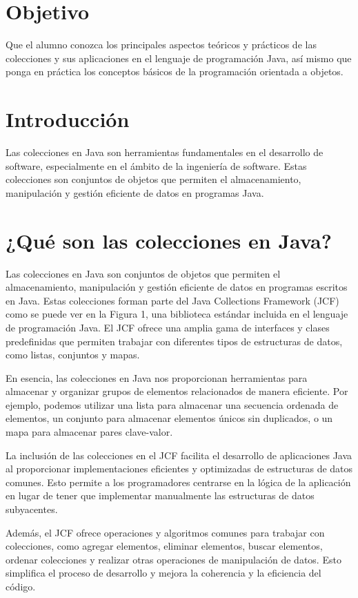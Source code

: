 \documentclass[a4paper,12pt]{article}
\begin{document}
\section{Objetivo}
Que el alumno conozca los principales aspectos teóricos y prácticos de las colecciones y sus aplicaciones en el lenguaje de programación Java, así mismo que ponga en práctica los conceptos básicos de la programación orientada a objetos.

\section{Introducción}

Las colecciones en Java son herramientas fundamentales en el desarrollo de software, especialmente en el ámbito de la ingeniería de software. Estas colecciones son conjuntos de objetos que permiten el almacenamiento, manipulación y gestión eficiente de datos en programas Java.

\section{¿Qué son las colecciones en Java?}

Las colecciones en Java son conjuntos de objetos que permiten el almacenamiento, manipulación y gestión eficiente de datos en programas escritos en Java. Estas colecciones forman parte del Java Collections Framework (JCF) como se puede ver en la Figura 1, una biblioteca estándar incluida en el lenguaje de programación Java. El JCF ofrece una amplia gama de interfaces y clases predefinidas que permiten trabajar con diferentes tipos de estructuras de datos, como listas, conjuntos y mapas.

En esencia, las colecciones en Java nos proporcionan herramientas para almacenar y organizar grupos de elementos relacionados de manera eficiente. Por ejemplo, podemos utilizar una lista para almacenar una secuencia ordenada de elementos, un conjunto para almacenar elementos únicos sin duplicados, o un mapa para almacenar pares clave-valor.

La inclusión de las colecciones en el JCF facilita el desarrollo de aplicaciones Java al proporcionar implementaciones eficientes y optimizadas de estructuras de datos comunes. Esto permite a los programadores centrarse en la lógica de la aplicación en lugar de tener que implementar manualmente las estructuras de datos subyacentes.

Además, el JCF ofrece operaciones y algoritmos comunes para trabajar con colecciones, como agregar elementos, eliminar elementos, buscar elementos, ordenar colecciones y realizar otras operaciones de manipulación de datos. Esto simplifica el proceso de desarrollo y mejora la coherencia y la eficiencia del código.
\end{document}
